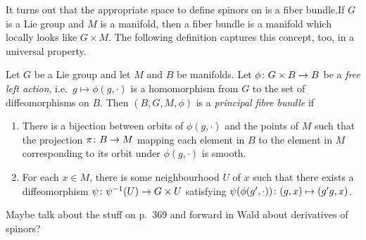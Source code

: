 It turns out that the appropriate space to define spinors on is a fiber bundle.If $G$ is a Lie group and $M$ is a manifold, then a fiber bundle is a manifold which locally looks like $G \times M$. The following definition captures this concept, too, in a universal property.
\begin{definition*}
	Let $G$ be a Lie group and let $M$ and $B$ be manifolds. Let $\phi \colon G \times B \to B$ be a \emph{free left action}, i.e.\ $g \mapsto \phi(g, \cdot)$ is a homomorphism from $G$ to the set of diffeomorphisms on $B$. Then $(B, G, M, \phi)$ is a \emph{principal fibre bundle} if
	\begin{enumerate}
		\item There is a bijection between orbits of $\phi(g, \cdot)$ and the points of $M$ such that the projection $\pi \colon B \to M$ mapping each element in $B$ to the element in $M$ corresponding to its orbit under $\phi(g, \cdot)$ is smooth.
		\item For each $x \in M$, there is some neighbourhood $U$ of $x$ such that there exists a diffeomorphism $\psi \colon \psi^{-1}(U) \to G \times U$ satisfying $\psi(\phi(g', \cdot)) \colon (g, x) \mapsto (g' g, x)$.
	\end{enumerate}
\end{definition*}


Maybe talk about the stuff on p.\ 369 and forward in Wald about derivatives of spinors?


